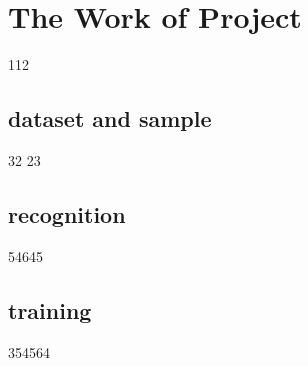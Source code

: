 \documentclass[twoside,colorbacktitle,accentcolor=tud6a]{tudexercise}
\begin{document}
  
  
  \section{The Work of Project}
  112
   
  \subsection{dataset and sample}
  
   32
   23 

  

  
  
  
  \subsection{recognition}
 54645
    

  \subsection{training}
	354564
  
  
  
 
\end{document}
